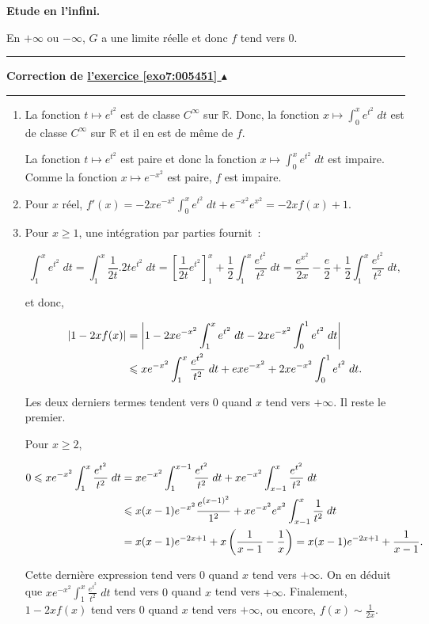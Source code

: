 \documentclass[11pt,a4paper]{article}
\newcommand{\Rr}{\mathbb{R}} \newcommand{\R}{\mathbb{R}}
\newcounter{exo}
\newcommand{\correction}[1]{\hypertarget{cor7:#1}{}\label{cor7:#1}{\bf Correction de \hyperlink{exo7:#1}{l'exercice \ref{exo7:#1} $\blacktriangle$}}\vspace{1mm}\hrule\vspace{1mm}}
\newcommand{\fincorrection}{\vspace{1mm}\hrule\vspace*{7mm}}
\begin{document}
\textbf{Etude en l'infini.}

En $+\infty$ ou $-\infty$, $G$ a une limite réelle et donc $f$ tend vers $0$.
\fincorrection
\correction{005451}
\begin{enumerate}
\item  La fonction $t\mapsto e^{t^2}$ est de classe $C^\infty$ sur $\Rr$. Donc, la fonction $x\mapsto\int_{0}^{x}e^{t^2}\;dt$ est de classe $C^\infty$ sur $\Rr$ et il en est de même de $f$.

La fonction $t\mapsto e^{t^2}$ est paire et donc la fonction $x\mapsto\int_{0}^{x}e^{t^2}\;dt$ est impaire. Comme la fonction $x\mapsto e^{-x^2}$ est paire, $f$ est impaire.

\item  Pour $x$ réel, $f'(x)=-2xe^{-x^2}\int_{0}^{x}e^{t^2}\;dt+e^{-x^2}e^{x^2}=-2xf(x)+1$.
\item  Pour $x\geq1$, une intégration par parties fournit~:

$$\int_{1}^{x}e^{t^2}\;dt=\int_{1}^{x}\frac{1}{2t}.2te^{t^2}\;dt=\left[\frac{1}{2t}e^{t^2}\right]_{1}^{x}+\frac{1}{2}\int_{1}^{x}\frac{e^{t^2}}{t^2}\;dt=\frac{e^{x^2}}{2x}-\frac{e}{2}+\frac{1}{2}\int_{1}^{x}\frac{e^{t^2}}{t^2}\;dt,$$

et donc,
 
\begin{align*}\ensuremath
|1-2xf(x)|&=\left|1-2xe^{-x^2}\int_{1}^{x}e^{t^2}\;dt-2xe^{-x^2}\int_{0}^{1}e^{t^2}\;dt\right|\\
 &\leq xe^{-x^2}\int_{1}^{x}\frac{e^{t^2}}{t^2}\;dt+exe^{-x^2}+2xe^{-x^2}\int_{0}^{1}e^{t^2}\;dt.
\end{align*}

Les deux derniers termes tendent vers $0$ quand $x$ tend vers $+\infty$. Il reste le premier.

Pour $x\geq2$, 

\begin{align*}\ensuremath
0\leq xe^{-x^2}\int_{1}^{x}\frac{e^{t^2}}{t^2}\;dt&=xe^{-x^2}\int_{1}^{x-1}\frac{e^{t^2}}{t^2}\;dt+
xe^{-x^2}\int_{x-1}^{x}\frac{e^{t^2}}{t^2}\;dt\\
 &\leq x(x-1)e^{-x^2}\frac{e^{(x-1)^2}}{1^2}+xe^{-x^2}e^{x^2}\int_{x-1}^{x}\frac{1}{t^2}\;dt\\
 &=x(x-1)e^{-2x+1}+x\left(\frac{1}{x-1}-\frac{1}{x}\right)=x(x-1)e^{-2x+1}+\frac{1}{x-1}.
\end{align*}

Cette dernière expression tend vers $0$ quand $x$ tend vers $+\infty$. On en déduit que $xe^{-x^2}\int_{1}^{x}\frac{e^{t^2}}{t^2}\;dt$ tend vers $0$ quand $x$ tend vers $+\infty$. Finalement, $1-2xf(x)$ tend vers $0$ quand $x$ tend vers $+\infty$, ou encore, $f(x)\sim\frac{1}{2x}$.


\end{enumerate}
\end{document}
